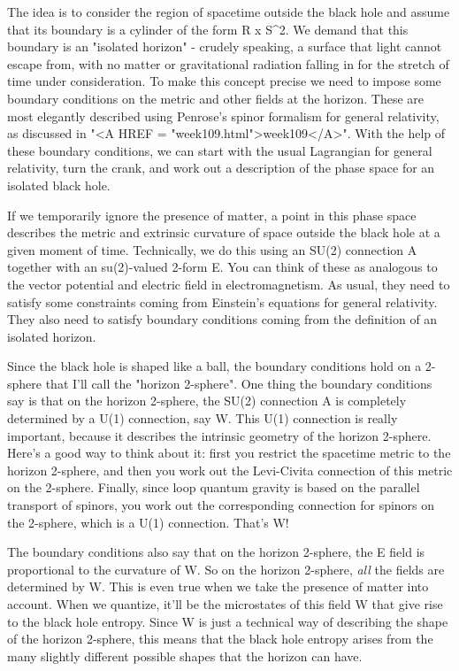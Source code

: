 The idea is to consider the region of spacetime outside the black hole
and assume that its boundary is a cylinder of the form R x
S^{2}.  We demand that this boundary is an "isolated
horizon" - crudely speaking, a surface that light cannot escape
from, with no matter or gravitational radiation falling in for the
stretch of time under consideration.  To make this concept precise we
need to impose some boundary conditions on the metric and other fields
at the horizon.  These are most elegantly described using Penrose's
spinor formalism for general relativity, as discussed in "<A HREF
= "week109.html">week109</A>".  With the help of these boundary
conditions, we can start with the usual Lagrangian for general
relativity, turn the crank, and work out a description of the phase
space for an isolated black hole.

If we temporarily ignore the presence of matter, a point in this phase 
space describes the metric and extrinsic curvature of space outside the
black hole at a given moment of time.   Technically, we do this using an
SU(2) connection A together with an su(2)-valued 2-form E.  You can
think of these as analogous to the vector potential and electric field
in electromagnetism.  As usual, they need to satisfy some constraints
coming from Einstein's equations for general relativity.  They also need
to satisfy boundary conditions coming from the definition of an isolated
horizon.  

Since the black hole is shaped like a ball, the boundary conditions hold
on a 2-sphere that I'll call the "horizon 2-sphere".   One thing the
boundary conditions say is that on the horizon 2-sphere, the SU(2)
connection A is completely determined by a U(1) connection, say W.  This
U(1) connection is really important, because it describes the intrinsic
geometry of the horizon 2-sphere.    Here's a good way to think about
it: first you restrict the spacetime metric to the horizon 2-sphere, and
then you work out the Levi-Civita connection of this metric on the
2-sphere.   Finally, since loop quantum gravity is based on the parallel
transport of spinors, you work out the corresponding connection for
spinors on the 2-sphere, which is a U(1) connection.   That's W!  

The boundary conditions also say that on the horizon 2-sphere, the E
field is proportional to the curvature of W.  So on the horizon
2-sphere, \emph{all} the fields are determined by W.  This is even true when
we take the presence of matter into account.  When we quantize, it'll be
the microstates of this field W that give rise to the black hole
entropy.  Since W is just a technical way of describing the shape of the
horizon 2-sphere, this means that the black hole entropy arises from the
many slightly different possible shapes that the horizon can have.

